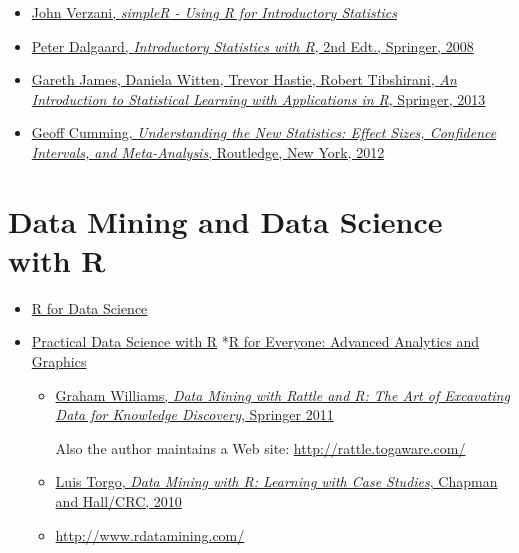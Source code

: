 \documentclass[
]{book}
\begin{document}
\begin{itemize}
\item
  \href{https://cran.r-project.org/doc/contrib/Verzani-SimpleR.pdf}{John Verzani, \emph{simpleR - Using R for Introductory Statistics}}
\item
  \href{https://www.springer.com/gp/book/9780387790534}{Peter Dalgaard, \emph{Introductory Statistics with R}, 2nd Edt., Springer, 2008}
\item
  \href{http://www.springer.com/it/book/9781461471370}{Gareth James, Daniela Witten, Trevor Hastie, Robert Tibshirani, \emph{An Introduction to Statistical Learning with Applications in R}, Springer, 2013}
\item
  \href{https://www.routledge.com/products/9780415879682}{Geoff Cumming, \emph{Understanding the New Statistics: Effect Sizes, Confidence Intervals, and Meta-Analysis}, Routledge, New York, 2012}
\end{itemize}

\hypertarget{data-mining-and-data-science-with-r}{%
\section{Data Mining and Data Science with R}\label{data-mining-and-data-science-with-r}}

\begin{itemize}
\item
  \href{https://r4ds.had.co.nz/}{R for Data Science}
\item
  \href{https://www.manning.com/books/practical-data-science-with-r-second-edition}{Practical Data Science with R}
  *\href{https://www.jaredlander.com/r-for-everyone/}{R for Everyone: Advanced Analytics and Graphics}

  \begin{itemize}
  \item
    \href{http://www.springer.com/gp/book/9781441998897}{Graham Williams, \emph{Data Mining with Rattle and R: The Art of Excavating Data for Knowledge Discovery}, Springer 2011}

    Also the author maintains a Web site:
    \url{http://rattle.togaware.com/}
  \item
    \href{https://www.crcpress.com/Data-Mining-with-R-Learning-with-Case-Studies/Torgo/9781439810187}{Luis Torgo, \emph{Data Mining with R: Learning with Case Studies}, Chapman and Hall/CRC, 2010}
  \item
    \url{http://www.rdatamining.com/}
  \end{itemize}
\end{itemize}
\end{document}

